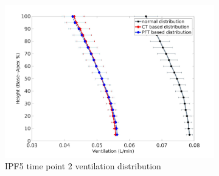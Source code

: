 \begin{figure}[htbp]  
\centering
\begin{subfigure}{.6\linewidth}%
  \includegraphics[width=\linewidth,trim={{.0\wd0} {.0\wd0} {.0\wd0} {.0\wd0}},clip]{Appendix/Image_AppexB/IPF501/IPF501_VentilationAgainstLungHeight.jpg} %
  \caption{IPF5 time point 2 ventilation distribution}
  \label{fig:IPF501VQDistribution-a} 
\end{subfigure} 
\begin{subfigure}{.6\linewidth}%

\end{subfigure}
\end{figure}
